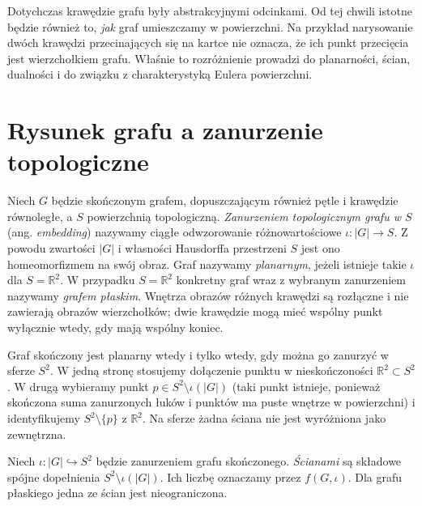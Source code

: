 Dotychczas krawędzie grafu były abstrakcyjnymi odcinkami. Od tej chwili
istotne będzie również to, \emph{jak} graf umieszczamy w powierzchni.
Na przykład narysowanie dwóch krawędzi przecinających się na kartce
nie oznacza, że ich punkt przecięcia jest wierzchołkiem grafu.
Właśnie to rozróżnienie prowadzi do planarności, ścian, dualności
i do związku z charakterystyką Eulera powierzchni.

\section{Rysunek grafu a zanurzenie topologiczne}
\label{sec:tg-osadzanie-planarne}

\begin{definicja}
Niech $G$ będzie skończonym grafem, dopuszczającym również pętle
i krawędzie równoległe, a $S$ powierzchnią topologiczną.
\emph{Zanurzeniem topologicznym grafu w $S$} (ang. \emph{embedding})
nazywamy ciągłe odwzorowanie różnowartościowe $\iota:|G|\to S$.
Z powodu zwartości $|G|$ i własności Hausdorffa przestrzeni $S$
jest ono homeomorfizmem na swój obraz. Graf nazywamy \emph{planarnym},
jeżeli istnieje takie $\iota$ dla $S=\mathbb R^2$.
W przypadku $S=\mathbb R^2$ konkretny graf wraz z wybranym
zanurzeniem nazywamy \emph{grafem płaskim}. Wnętrza obrazów różnych
krawędzi są rozłączne i nie zawierają obrazów wierzchołków;
dwie krawędzie mogą mieć wspólny punkt wyłącznie wtedy, gdy
mają wspólny koniec.
\end{definicja}

\begin{uwaga}
Graf skończony jest planarny wtedy i tylko wtedy, gdy można go
zanurzyć w sferze $S^2$. W jedną stronę stosujemy dołączenie
punktu w nieskończoności $\mathbb R^2\subset S^2$.
W drugą wybieramy punkt $p\in S^2\setminus\iota(|G|)$
(taki punkt istnieje, ponieważ skończona suma zanurzonych łuków
i punktów ma puste wnętrze w powierzchni)
i identyfikujemy $S^2\setminus\{p\}$ z $\mathbb R^2$.
Na sferze żadna ściana nie jest wyróżniona jako zewnętrzna.
\end{uwaga}

\begin{definicja}[Ściana]
Niech $\iota:|G|\hookrightarrow S^2$ będzie zanurzeniem grafu
skończonego. \emph{Ścianami} są składowe spójne dopełnienia
$S^2\setminus\iota(|G|)$. Ich liczbę oznaczamy przez $f(G,\iota)$.
Dla grafu płaskiego jedna ze ścian jest nieograniczona.
\end{definicja}

